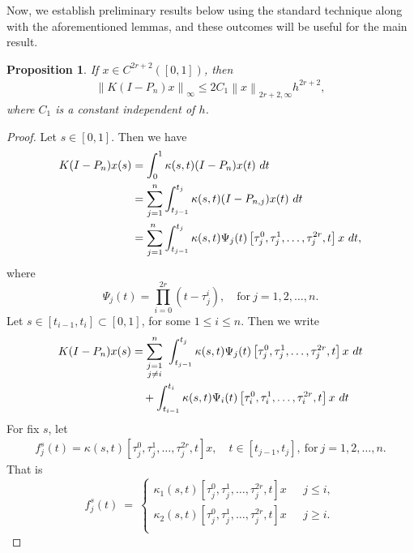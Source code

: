 \documentclass[sn-mathphys-num]{sn-jnl}%
\theoremstyle{thmstyleone}%
\newtheorem{proposition}[theorem]{Proposition}%
\theoremstyle{thmstyletwo}%
\theoremstyle{thmstylethree}%
\newcommand{\norm}[1]{\left\lVert #1\right\rVert}
\begin{document}
Now, we establish preliminary results below using the standard technique along with the aforementioned lemmas, and these outcomes will be useful for the main result.
\begin{proposition} \label{p1}
	If $x \in C^{2r+2}([0,1])$, then
	\begin{eqnarray*}
		\norm{K(I-P_n)x }_\infty \le 2C_1 \norm{x}_{2r+2, \infty} h^{2r + 2},
	\end{eqnarray*}
	where $C_1$ is a constant independent of $h$.
\end{proposition}
\begin{proof} Let $s \in [0,1]$. Then we have
	\begin{align*}
		K(I-P_n)x(s) &=\int_0^1  \kappa(s,t) (I-P_n) x(t) ~dt \notag \\
		&= \sum_{j=1}^{n} \int_{t_{j-1}}^{t_j}  \kappa(s,t) (I-P_{n,j})x(t) ~dt  \notag \\
		&= \sum_{j=1}^{n ~}\int_{t_{j-1}}^{t_j}  \kappa(s,t) \Psi_j(t)  \left[\tau_j^0,\tau_j^1,\ldots, \tau_j^{2r},t\right]x  ~dt,
	\end{align*}
	where
	$$
	\Psi_j(t) = \prod_{i=0}^{2r} (t- \tau_j^i), \quad \text{for} ~ j=1,2,\ldots,n.
	$$ 
	Let $s \in [t_{i-1},t_i] \subset [0,1]$, for some $1 \le i \le n$. Then we write
	\begin{align} \label{Eq: 22}
		K(I-P_n)x(s) &= \sum_{\substack{j=1 \\  j\ne i} }^{n} ~	\int_{t_{j-1}}^{t_j}  \kappa(s,t) \Psi_j(t) \left[\tau_j^0,\tau_j^1,\ldots, \tau_j^{2r},t\right]x ~dt \notag \\
		& \quad + \int_{t_{i-1}}^{t_i}  \kappa(s,t) \Psi_i(t) \left[\tau_i^0,\tau_i^1,\ldots, \tau_i^{2r},t\right]x ~dt 		
	\end{align}
	For fix $s$, let
	\begin{align*}
		f_j^s(t) =  \kappa(s,t) \left[\tau_j^0,\tau_j^1,\ldots, \tau_j^{2r},t\right]x, \quad t \in [t_{j-1}, t_j], ~ \text{for} ~ j=1,2,\ldots,n.
	\end{align*}
	That is
	\begin{equation*}
		f_j^s(t) ~= ~
		\begin{cases}
			\kappa_1(s,t) \left[\tau_j^0,\tau_j^1,\ldots, \tau_j^{2r},t\right]x  ~~~         &  j \le i,\\
			\kappa_2(s,t) \left[\tau_j^0,\tau_j^1,\ldots, \tau_j^{2r},t\right]x ~~~          &  j \ge i.\\
		\end{cases} 

\end{equation*}
\end{proof}
\end{document}
